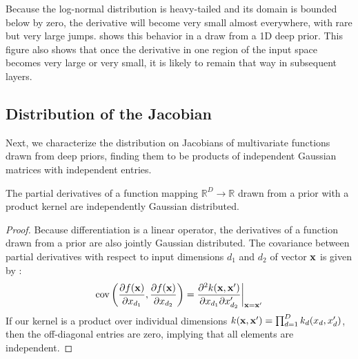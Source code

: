 Because the log-normal distribution is heavy-tailed and its domain is bounded below by zero, the derivative will become very small almost everywhere, with rare but very large jumps.  
 shows this behavior in a draw from a 1D deep \gp{} prior.
This figure also shows that once the derivative in one region of the input space becomes very large or very small, it is likely to remain that way in subsequent layers.
%







\subsection{Distribution of the Jacobian}
\label{sec:theorem}
Next, we characterize the distribution on Jacobians of multivariate functions drawn from deep \gp{} priors, finding them to be products of independent Gaussian matrices with independent entries.

\begin{lemma}
\label{thm:deriv-ind}
The partial derivatives of a function mapping $\mathbb{R}^D \rightarrow \mathbb{R}$ drawn from a \gp{} prior with a product kernel are independently Gaussian distributed.
\end{lemma}
%
\begin{proof}
Because differentiation is a linear operator, the derivatives of a function drawn from a \gp{} prior are also jointly Gaussian distributed.
The covariance between partial derivatives with respect to input dimensions $d_1$ and $d_2$ of vector ${\bf{x}}$ is given by \citet{Solak03derivativeobservations}:
%
\begin{align}
\operatorname{cov} \left( \frac{\partial f({\bf{x}})}{\partial x_{d_1}}, \frac{\partial f({\bf{x}})}{\partial x_{d_2}} \right) 
= \frac{\partial^2 k({\bf{x}}, {\bf{x}}')}{\partial x_{d_1} \partial x_{d_2}'} \bigg|_{{\bf{x}}={\bf{x}}'}
\label{eq:deriv-kernel}
\end{align}
%
If our kernel is a product over individual dimensions $k({\bf{x}}, {\bf{x}}') = \prod_{d=1}^D k_d(x_d, x_d')$, 
then the off-diagonal entries are zero, implying that all elements are independent.
\end{proof}

